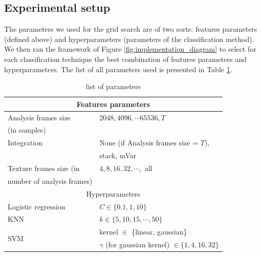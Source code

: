 \documentclass[10pt, conference, compsocconf]{IEEEtran}
\begin{document}
\subsection{Experimental setup}
The parameters we used for the grid search are of two sorts: features parameters (defined above) and hyperparameters (parameters of the classification method). We then ran the framework of Figure \ref{fig:implementation_diagram} to select for each classification technique the best combination of features parameters and hyperparameters. The list of all parameters used is presented in Table \ref{table:params}.

\begin{table}[h]
  \centering
  \scriptsize
  \begin{tabular}{|l|l|}
    \hline
    \multicolumn{2}{|c|}{Features parameters}                                          \\
      \hline
      Analysis frames size     & $2048, 4096, \cdots 65536, T$                         \\
      (in samples)             &                                                       \\
     \hline
     Integration               & None (if Analysis frames size = $T$),                 \\
                               & stack, mVar                                           \\
    \hline
    Texture frames size (in    & $4,8,16,32, \cdots,$ all                              \\
    number of analysis frames) &                                                       \\
    \hline
    \hline
    \multicolumn{2}{|c|}{Hyperparameters}                                              \\
     \hline
    Logistic regression        & $C \in \{0.1,1,10\}$                                  \\
    \hline
    KNN                        & $k \in \{5,10,15,\cdots,50\}$                         \\ 
    \hline
    \multirow{2}{*}{SVM}
                               & kernel $\in$ \{linear, gaussian\}                     \\
                               & $\gamma$ (for gaussian kernel) $\in \{1, 4, 16, 32\}$ \\       
  \hline

\end{tabular}
\caption{list of parameters \label{table:params}}
\end{table}
\end{document}
